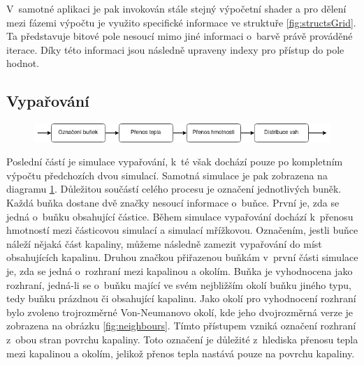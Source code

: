 V~samotné aplikaci je pak invokován stále stejný výpočetní shader a pro dělení mezi fázemi výpočtu je využito specifické informace ve struktuře \ref{fig:structsGrid}. Ta představuje bitové pole nesoucí mimo jiné informaci o~barvě právě prováděné iterace. Díky této informaci jsou následně upraveny indexy pro přístup do pole hodnot.

\subsection{Vypařování}
\label{chapter:simEvap}

\begin{figure}[hb!]
	\centering
	\captionsetup{justification=centering}
	\includegraphics[scale=0.6]{obrazky-figures/EvapFlow.png}
	\label{fig:EvapFlow}
\end{figure}

Poslední částí je simulace vypařování, k~té však dochází pouze po kompletním výpočtu předchozích dvou simulací. Samotná simulace je pak zobrazena na diagramu \ref{fig:EvapFlow}. Důležitou součástí celého procesu je označení jednotlivých buněk. Každá buňka dostane dvě značky nesoucí informace o~buňce. První je, zda se jedná o~buňku obsahující částice. Během simulace vypařování dochází k~přenosu hmotností mezi částicovou simulací a simulací mřížkovou. Označením, jestli buňce náleží nějaká část kapaliny, můžeme následně zamezit vypařování do míst obsahujících kapalinu. Druhou značkou přiřazenou buňkám v~první části simulace je, zda se jedná o~rozhraní mezi kapalinou a okolím. Buňka je vyhodnocena jako rozhraní, jedná-li se o~buňku mající ve svém nejbližším okolí buňku jiného typu, tedy buňku prázdnou či obsahující kapalinu. Jako okolí pro vyhodnocení rozhraní bylo zvoleno trojrozměrné Von-Neumanovo okolí, kde jeho dvojrozměrná verze je zobrazena na obrázku \ref{fig:neighbours}. Tímto přístupem vzniká označení rozhraní z~obou stran povrchu kapaliny. Toto označení je důležité z~hlediska přenosu tepla mezi kapalinou a okolím, jelikož přenos tepla nastává pouze na povrchu kapaliny. 

